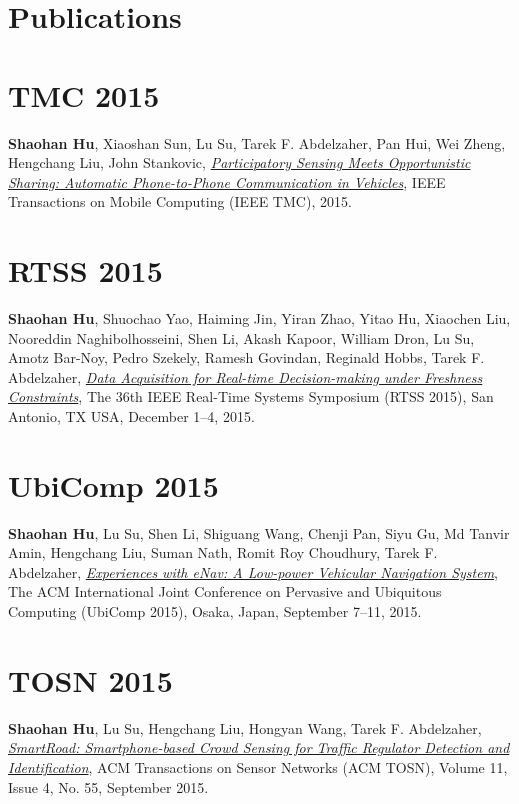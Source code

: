 \section{\sc Publications}

\section{\sc TMC 2015}\hypertarget{hu2015tmc}{} \textbf{Shaohan Hu}, Xiaoshan Sun, Lu Su, Tarek F. Abdelzaher, Pan Hui, Wei Zheng, Hengchang Liu, John Stankovic, \href{}{\emph{Participatory Sensing Meets Opportunistic
Sharing: Automatic Phone-to-Phone
Communication in Vehicles}}, \textsf{IEEE Transactions on Mobile Computing (IEEE TMC)}, 2015.

\section{\sc RTSS 2015}\hypertarget{hu2015rtss}{} \textbf{Shaohan Hu}, Shuochao Yao, Haiming Jin, Yiran Zhao, Yitao Hu, Xiaochen Liu, Nooreddin Naghibolhosseini, Shen Li, Akash Kapoor, William Dron, Lu Su, Amotz Bar-Noy, Pedro Szekely, Ramesh Govindan, Reginald Hobbs, Tarek F. Abdelzaher, \href{}{\emph{Data Acquisition for Real-time Decision-making under Freshness Constraints}}, \textsf{The 36th IEEE Real-Time Systems Symposium (RTSS 2015)}, San Antonio, TX USA, December 1--4, 2015.

\section{\sc UbiComp 2015}\hypertarget{hu2015ubicomp}{} \textbf{Shaohan Hu}, Lu Su, Shen Li, Shiguang Wang, Chenji Pan, Siyu Gu, Md Tanvir Amin, Hengchang Liu, Suman Nath, Romit Roy Choudhury, Tarek F. Abdelzaher, \href{}{\emph{Experiences with eNav: A Low-power Vehicular Navigation System}}, \textsf{The ACM International Joint Conference on Pervasive and Ubiquitous Computing (UbiComp 2015)}, Osaka, Japan, September 7--11, 2015.

\section{\sc TOSN 2015}\hypertarget{hu2015tosn}{} \textbf{Shaohan Hu}, Lu Su, Hengchang Liu, Hongyan Wang, Tarek F. Abdelzaher, \href{http://dl.acm.org/citation.cfm?id=2770876}{\emph{SmartRoad: Smartphone-based Crowd Sensing for Traffic Regulator Detection and Identification}}, \textsf{ACM Transactions on Sensor Networks (ACM TOSN)}, Volume 11, Issue 4, No. 55, September 2015.


